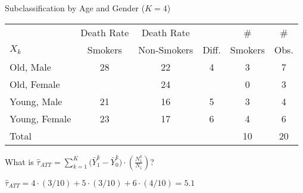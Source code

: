 \documentclass{beamer}
\numberwithin{equation}{section}
\begin{document}
\begin{frame}{Subclassification by Age and Gender ($K = 4$)}

\begin{tabular}{l|c|c|c|c|c}
           & Death Rate & Death Rate &            &         \# &         \#  \\
       $X_k$ &    Smokers & Non-Smokers &      Diff. &    Smokers &       Obs. \\
       \hline
 Old, Male &         28 &         22 &          4 &          3 &          7 \\
 \hline
Old, Female &            &         24 &            &          0 &          3 \\
\hline
Young, Male &         21 &         16 &          5 &          3 &          4 \\
\hline
Young, Female &         23 &         17 &          6 &          4 &          6 \\
\hline
     Total &            &            &            &         10 &         20 \\
\end{tabular}

What is
$\widehat{\tau}_{ATT}= \sum_{k=1}^K \big( \bar{Y}_1^k - \bar{Y}_0^k \big)\cdot \left( \frac{N_1^k}{N_1} \right)$?
\pause

$\widehat{\tau}_{ATT}= 4\cdot(3/10)+5\cdot(3/10)+6\cdot(4/10)=5.1$

\end{frame}

%
%
%
%
%
%
%
\end{document}

